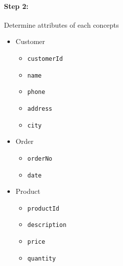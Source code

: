 \documentclass{assignment}
\begin{document}
\paragraph{Step 2:} Determine attributes of each concepts
\\

\noindent
\begin{minipage}[t]{0.31\textwidth}
    \begin{itemize}[noitemsep]
        \item Customer
            \begin{itemize}[noitemsep]
                \item \texttt{customerId}
                \item \texttt{name}
                \item \texttt{phone}
                \item \texttt{address}
                \item \texttt{city}
            \end{itemize}
    \end{itemize}
\end{minipage}
\hfill
\begin{minipage}[t]{0.31\textwidth}
    \begin{itemize}[noitemsep]
        \item Order
            \begin{itemize}[noitemsep]
                \item \texttt{orderNo}
                \item \texttt{date}
            \end{itemize}
    \end{itemize}
\end{minipage}
\hfill
\begin{minipage}[t]{0.31\textwidth}
    \begin{itemize}[noitemsep]
        \item Product
            \begin{itemize}[noitemsep]
                \item \texttt{productId}
                \item \texttt{description}
                \item \texttt{price}
                \item \texttt{quantity}
            \end{itemize}
    \end{itemize}
\end{minipage}
\end{document}
